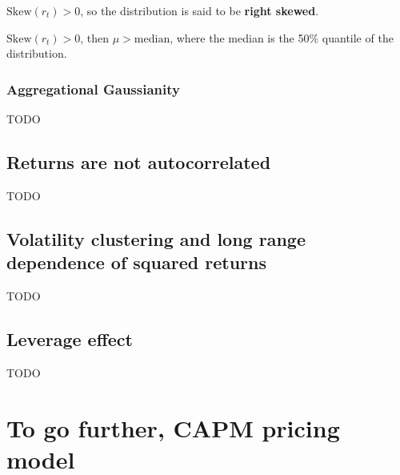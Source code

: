 \documentclass{article}
\begin{document}
\( \text{Skew}(r_t) > 0 \), so the distribution is said to be \textbf{right skewed}. 

\( \text{Skew}(r_t) > 0 \), then \( \mu > \text{median} \), where the median is the 50\% quantile of the distribution.

\subsubsection{Aggregational Gaussianity}
TODO
\subsection{Returns are not autocorrelated}
TODO
\subsection{Volatility clustering and long range dependence of squared returns}
TODO
\subsection{Leverage effect}
TODO

\appendix



\section{To go further, CAPM pricing model}


\end{document}
